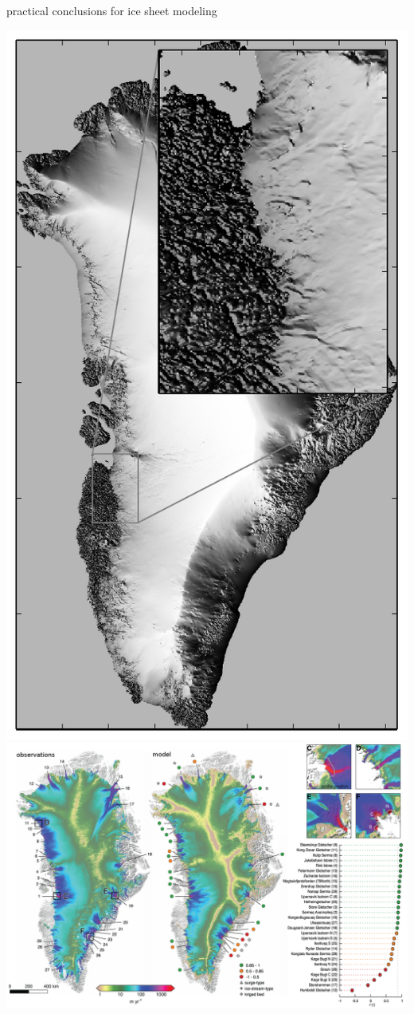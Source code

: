 \documentclass[hide notes,intlimits]{beamer}
\begin{document}
\begin{frame}{practical conclusions for ice sheet modeling}
\begin{itemize}
\vspace{2mm}
\begin{center}
\includegraphics[height=0.45\textheight]{grnwinset} \qquad
\includegraphics[height=0.45\textheight]{greenland-overview-relabel}
\end{center}
\end{itemize}
\end{frame}
\end{document}
